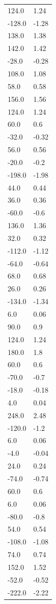 \begin{longtable}{ll}
124.0 & 1.24 \\
-128.0 & -1.28 \\
138.0 & 1.38 \\
142.0 & 1.42 \\
-28.0 & -0.28 \\
108.0 & 1.08 \\
58.0 & 0.58 \\
156.0 & 1.56 \\
124.0 & 1.24 \\
60.0 & 0.6 \\
-32.0 & -0.32 \\
56.0 & 0.56 \\
-20.0 & -0.2 \\
-198.0 & -1.98 \\
44.0 & 0.44 \\
36.0 & 0.36 \\
-60.0 & -0.6 \\
136.0 & 1.36 \\
32.0 & 0.32 \\
-112.0 & -1.12 \\
-64.0 & -0.64 \\
68.0 & 0.68 \\
26.0 & 0.26 \\
-134.0 & -1.34 \\
6.0 & 0.06 \\
90.0 & 0.9 \\
124.0 & 1.24 \\
180.0 & 1.8 \\
60.0 & 0.6 \\
-70.0 & -0.7 \\
-18.0 & -0.18 \\
4.0 & 0.04 \\
248.0 & 2.48 \\
-120.0 & -1.2 \\
6.0 & 0.06 \\
-4.0 & -0.04 \\
24.0 & 0.24 \\
-74.0 & -0.74 \\
60.0 & 0.6 \\
6.0 & 0.06 \\
-80.0 & -0.8 \\
54.0 & 0.54 \\
-108.0 & -1.08 \\
74.0 & 0.74 \\
152.0 & 1.52 \\
-52.0 & -0.52 \\
-222.0 & -2.22 \\

\end{longtable}
